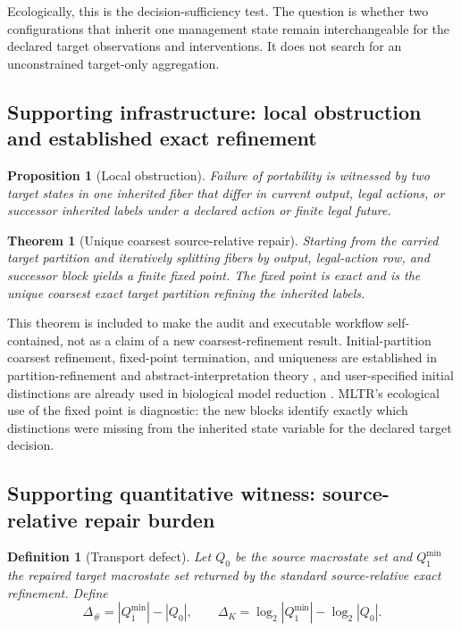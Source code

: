\documentclass[11pt]{article}
\newtheorem{theorem}{Theorem}
\newtheorem{proposition}{Proposition}
\newtheorem{definition}{Definition}
\begin{document}
Ecologically, this is the decision-sufficiency test. The question is whether two configurations that inherit one management state remain interchangeable for the declared target observations and interventions. It does not search for an unconstrained target-only aggregation.

\subsection{Supporting infrastructure: local obstruction and established exact refinement}
\begin{proposition}[Local obstruction]
Failure of portability is witnessed by two target states in one inherited fiber that differ in current output, legal actions, or successor inherited labels under a declared action or finite legal future.
\end{proposition}

\begin{theorem}[Unique coarsest source-relative repair]
Starting from the carried target partition and iteratively splitting fibers by output, legal-action row, and successor block yields a finite fixed point. The fixed point is exact and is the unique coarsest exact target partition refining the inherited labels.
\end{theorem}

This theorem is included to make the audit and executable workflow self-contained, not as a claim of a new coarsest-refinement result. Initial-partition coarsest refinement, fixed-point termination, and uniqueness are established in partition-refinement and abstract-interpretation theory \citep{PaigeTarjan1987,Fernandez1990,RanzatoTapparo2007}, and user-specified initial distinctions are already used in biological model reduction \citep{ArgyrisEtAl2023}. MLTR's ecological use of the fixed point is diagnostic: the new blocks identify exactly which distinctions were missing from the inherited state variable for the declared target decision.

\subsection{Supporting quantitative witness: source-relative repair burden}
\begin{definition}[Transport defect]
Let $Q_0$ be the source macrostate set and $Q_1^{\min}$ the repaired target macrostate set returned by the standard source-relative exact refinement. Define
\[
\Delta_{\#}=|Q_1^{\min}|-|Q_0|,
\qquad
\Delta_{K}=\log_2|Q_1^{\min}|-\log_2|Q_0|.
\]
\end{definition}
\end{document}
